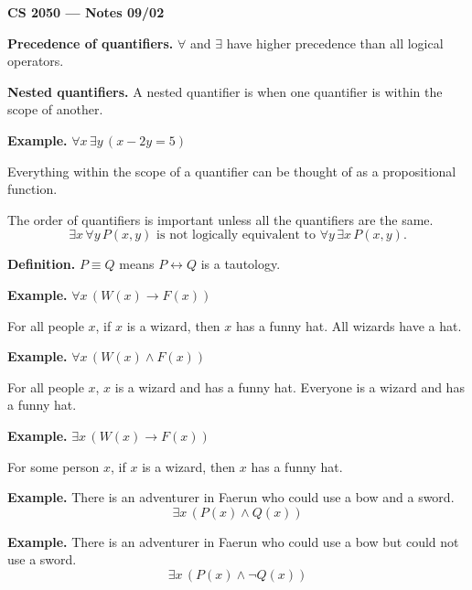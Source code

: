 \documentclass{article}
\begin{document}
\textbf{CS 2050 --- Notes 09/02}

\bigskip

\textbf{Precedence of quantifiers.} $\forall$ and $\exists$ have higher precedence than all logical operators.

\bigskip

\textbf{Nested quantifiers.} A nested quantifier is when one quantifier is within the scope of another.

\medskip

\textbf{Example.} $\forall x \, \exists y \, (x - 2y = 5)$

\bigskip

Everything within the scope of a quantifier can be thought of as a propositional function.

\medskip

The order of quantifiers is important unless all the quantifiers are the same.
\[
\exists x \, \forall y \, P(x,y) \text{ is not logically equivalent to } \forall y \, \exists x \, P(x,y).
\]

\bigskip

\textbf{Definition.} $P \equiv Q$ means $P \leftrightarrow Q$ is a tautology.

\bigskip

\textbf{Example.} $\forall x \, (W(x) \to F(x))$

\medskip

For all people $x$, if $x$ is a wizard, then $x$ has a funny hat. All wizards have a hat.

\bigskip

\textbf{Example.} $\forall x \, (W(x) \land F(x))$

\medskip

For all people $x$, $x$ is a wizard and has a funny hat. Everyone is a wizard and has a funny hat.

\bigskip

\textbf{Example.} $\exists x \, (W(x) \to F(x))$

\medskip

For some person $x$, if $x$ is a wizard, then $x$ has a funny hat.

\bigskip

\textbf{Example.} There is an adventurer in Faerun who could use a bow and a sword.
\[
\exists x \, (P(x) \land Q(x))
\]

\bigskip

\textbf{Example.} There is an adventurer in Faerun who could use a bow but could not use a sword.
\[
\exists x \, (P(x) \land \lnot Q(x))
\]
\end{document}
